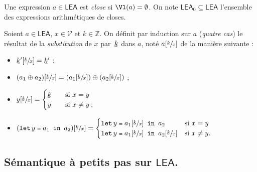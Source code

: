 \documentclass[../main]{subfiles}
\begin{document}
  \begin{defn}
    Une expression $a \in \mathsf{LEA}$ est \textit{close} si $\Vl(a) = \emptyset$.
    On note $\mathsf{LEA}_0 \subseteq \mathsf{LEA}$ l'ensemble des expressions arithmétiques de closes.
  \end{defn}

  \begin{defn}
    Soient $a \in \mathsf{LEA}$, $x \in \mathcal{V}$ et $k \in \mathds{Z}$.
    On définit par induction sur $a$ (\textit{quatre cas}) le résultat de la \textit{substitution} de $x$ par~$\ubar k$ dans $a$, noté $a[\sfrac{\ubar k}{x}]$ de la manière suivante :
    \begin{itemize}
      \item $\ubar{k'}[\sfrac{\ubar k}{x}] = \ubar{k'}$ ;
      \item $(a_1 \oplus a_2)[\sfrac{\ubar k}{x}] = (a_1[\sfrac{\ubar k}{x}]) \oplus (a_2[\sfrac{\ubar k}{x}])$ ;
      \item $y[\sfrac{\ubar k}{x}] = \begin{cases}
          \ubar k \quad& \text{si}\ x = y\\
          y \quad& \text{si}\ x \neq y\: ;
      \end{cases}$
    \item $(\letin y {a_1} {a_2})[\sfrac{\ubar k}{x}] = \begin{cases}
        \letin y {a_1[\sfrac{\ubar k}{x}]} a_2 & \text{si}\ x = y\\
        \letin y {a_1[\sfrac{\ubar k}{x}]} a_2[\sfrac{\ubar k}{x}] & \text{si}\ x \neq y.
    \end{cases}$
    \end{itemize}
  \end{defn}

  \subsection{Sémantique à petits pas sur $\mathsf{LEA}$.}
\end{document}
